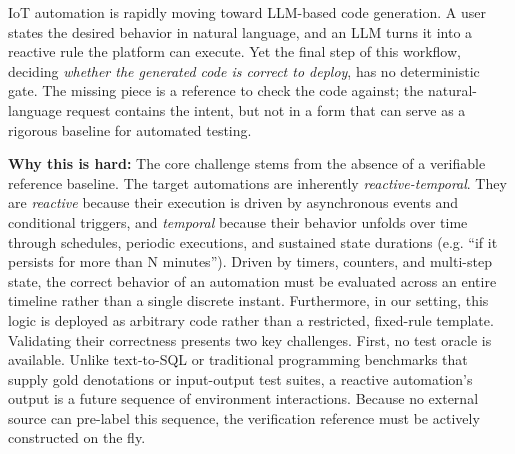 \documentclass[sigconf,nonacm,anonymous,review]{acmart}
\begin{document}
IoT automation is rapidly moving toward LLM-based code generation. A user states the desired behavior in natural language, and an LLM turns it into a reactive rule the platform can execute. Yet the final step of this workflow, deciding \emph{whether the generated code is correct to deploy}, has no deterministic gate. The missing piece is a reference to check the code against; the natural-language request contains the intent, but not in a form that can serve as a rigorous baseline for automated testing.

\textbf{Why this is hard: %
} The core challenge stems from the absence of a verifiable reference baseline. The target automations are inherently \emph{reactive-temporal}. They are \emph{reactive} because their execution is driven by asynchronous events and conditional triggers, %
and \emph{temporal} because their behavior unfolds over time through schedules, periodic executions, and sustained state durations (e.g. ``if it persists for more than N minutes'').
Driven by timers, counters, and multi-step state, the correct behavior of an automation must be evaluated across an entire timeline rather than a single discrete instant. Furthermore, in our setting, this logic is deployed as arbitrary code rather than a restricted, fixed-rule template.
Validating their correctness presents two key challenges. First, no test oracle is available. 
Unlike text-to-SQL or traditional programming benchmarks that supply gold denotations or input-output test suites, a reactive automation's output is a future sequence of environment interactions. Because no external source can pre-label this sequence, the verification reference must be actively constructed on the fly. 
\end{document}
